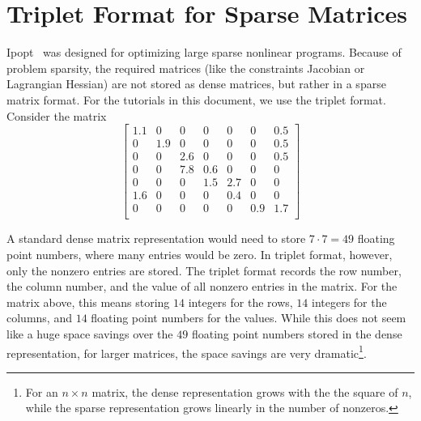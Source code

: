 \documentclass[10pt]{article}
\newcommand{\Ipopt}{{\sc Ipopt }}
\begin{document}
\appendix
\newpage
\section{Triplet Format for Sparse Matrices}\label{app.triplet}
\Ipopt\ was designed for optimizing large sparse nonlinear programs.
Because of problem sparsity, the required matrices (like the
constraints Jacobian or Lagrangian Hessian) are not stored as dense
matrices, but rather in a sparse matrix format. For the tutorials in
this document, we use the triplet format.  Consider the matrix
\begin{equation}
\label{eqn.ex_matrix}
\left[
\begin{array}{ccccccc}
1.1     & 0             & 0             & 0             & 0             & 0             & 0.5 \\
0       & 1.9   & 0             & 0             & 0             & 0             & 0.5 \\
0       & 0             & 2.6   & 0             & 0             & 0             & 0.5 \\
0       & 0             & 7.8   & 0.6   & 0             & 0             & 0    \\
0       & 0             & 0             & 1.5   & 2.7   & 0             & 0     \\
1.6     & 0             & 0             & 0             & 0.4   & 0             & 0     \\
0       & 0             & 0             & 0             & 0             & 0.9   & 1.7 \\
\end{array}
\right]
\end{equation}

A standard dense matrix representation would need to store $7 \cdot
7{=} 49$ floating point numbers, where many entries would be zero. In
triplet format, however, only the nonzero entries are stored. The
triplet format records the row number, the column number, and the
value of all nonzero entries in the matrix. For the matrix above, this
means storing $14$ integers for the rows, $14$ integers for the
columns, and $14$ floating point numbers for the values. While this
does not seem like a huge space savings over the $49$ floating point
numbers stored in the dense representation, for larger matrices, the
space savings are very dramatic\footnote{For an $n \times n$ matrix,
the dense representation grows with the the square of $n$, while the
sparse representation grows linearly in the number of nonzeros.}.
\end{document}
